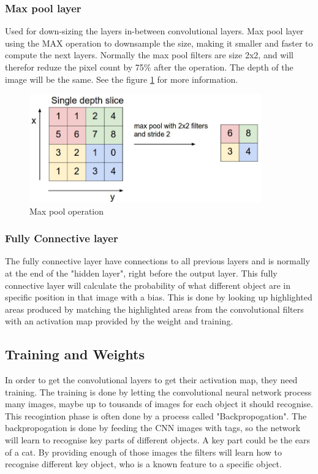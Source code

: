 \subsubsection{Max pool layer}
Used for down-sizing the layers in-between convolutional layers. Max pool layer using the MAX operation to downsample the size, making it smaller and faster to compute the next layers. Normally the max pool filters are size 2x2, and will therefor reduze the pixel count by 75\% after the operation. The depth of the image will be the same. See the figure \ref{fig:maxpool} for more information.
\begin{figure}%
    \centering
        \includegraphics[width=10cm]{img/maxpool.jpeg}
    \caption{Max pool operation \cite{SF_ConvNet} }
    \label{fig:maxpool}
\end{figure}

\subsubsection{Fully Connective layer}
The fully connective layer have connections to all previous layers and is normally at the end of the "hidden layer", right before the output layer. This fully connective layer will calculate the probability of what different object are in specific position in that image with a bias. This is done by looking up highlighted areas produced by matching the highlighted areas from the convolutional filters with an activation map provided by the weight and training. 

\subsection{Training and Weights}

In order to get the convolutional layers to get their activation map, they need training. The training is done by letting the convolutional neural network process many images, maybe up to tousands of images for each object it should recognise. This recogintion phase is often done by a process called "Backpropogation". The backpropogation is done by feeding the CNN images with tags, so the network will learn to recognise key parts of different objects. A key part could be the ears of a cat. By providing enough of those images the filters will learn how to recognise different key object, who is a known feature to a specific object.

